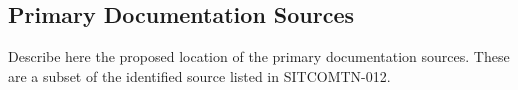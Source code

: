 \subsection{Primary Documentation Sources}
\label{sec:primary-sources}

Describe here the proposed location of the primary documentation sources.  These are a subset of the identified source listed in SITCOMTN-012.

